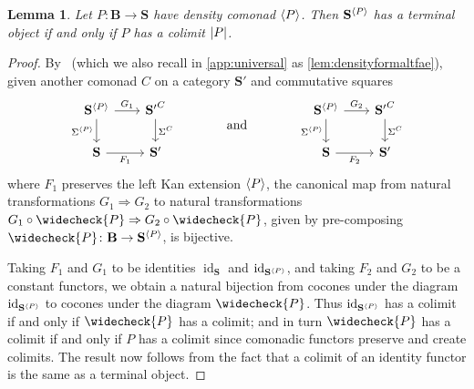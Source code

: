 \documentclass[11pt, oneside, article]{memoir}
\theoremstyle{plain}
\newtheorem{lemma}[theorem]{Lemma}
\theoremstyle{definition}
\theoremstyle{remark}
\DeclareMathOperator{\id}{id}
\DeclarePairedDelimiter{\gen}{\langle}{\rangle}
\DeclarePairedDelimiter{\abs}{\lvert}{\rvert}
\newcommand{\tn}[1]{\textnormal{#1}}
\newcommand{\cat}[1]{\mathbf{#1}}
\newcommand{\CoalgOn}[2]{{#2}^{#1}}
\newcommand{\CoalgS}[1]{\CoalgOn{#1}{\bS}}
\newcommand{\pts}[1]{{\abs{#1}}}
\newcommand{\lift}[1]{\widecheck{#1}}
\newcommand{\carr}{\Sigma}
\newcommand{\car}[1]{\carr^{#1}}
\newcommand{\carC}{\car{\cC}}
\newcommand{\carP}{\car{\cP}}
\newcommand{\ph}[1]{#1}
\newcommand{\cmnd}[1]{{#1}}
\newcommand{\cC}{\cmnd{C}}
\newcommand{\bB}{\cat{B}}
\newcommand{\bS}{\cat{S}}
\newcommand{\pP}{\ph{P}}
\newcommand{\cP}{\gen{\pP}}
\newcommand{\lP}{\lift{\pP}}
\newcommand{\PS}{\CoalgS{\cP}}
\newcommand{\hh}[2][]{#1 \tn{#2} #1}
\newcommand{\qqand}{\hh[\qquad]{and}}
\begin{document}
\begin{lemma}\label{lem:pts}
  Let $\pP \colon \bB \to \bS$ have density comonad $\cP$. Then $\PS$
  has a terminal object if and only if $\pP$ has a colimit
  $\pts{\pP}$.
\end{lemma}
\begin{proof}
  By~\cite[Proposition 7.6]{fairbanks:monads} (which we also recall in
  \cref{app:universal} as \cref{lem:densityformaltfae}), given another
  comonad $\cC$ on a category $\bS'$ and commutative squares
  \[
    \begin{tikzcd}[column sep=20]
      {\PS} & \CoalgOn{\cC}{\bS'} \\
      {\bS} & {\bS'}
      \arrow["G_1", from=1-1, to=1-2]
      \arrow["\carP"', from=1-1, to=2-1]
      \arrow["\carC", from=1-2, to=2-2]
      \arrow["F_1"', from=2-1, to=2-2]
    \end{tikzcd}
    \qquad\qqand\qquad
    \begin{tikzcd}[column sep=20]
      {\PS} & \CoalgOn{\cC}{\bS'} \\
      {\bS} & {\bS'}
      \arrow["G_2", from=1-1, to=1-2]
      \arrow["\carP"', from=1-1, to=2-1]
      \arrow["\carC", from=1-2, to=2-2]
      \arrow["F_2"', from=2-1, to=2-2]
    \end{tikzcd}
  \]
  where $F_1$ preserves the left Kan extension $\cP$, the canonical
  map from natural transformations $G_1 \Rightarrow G_2$ to natural
  transformations $G_1 \circ \lP \Rightarrow G_2 \circ \lP$, given by
  pre-composing $\lP \colon \bB \to \PS$, is bijective.

  Taking $F_1$ and $G_1$ to be identities $\id_{\bS}$ and $\id_{\PS}$,
  and taking $F_2$ and $G_2$ to be a constant functors, we obtain a
  natural bijection from cocones under the diagram $\id_{\PS}$ to
  cocones under the diagram $\lP$. Thus $\id_{\PS}$ has a colimit if
  and only if $\lP$ has a colimit; and in turn $\lP$ has a colimit if
  and only if $\pP$ has a colimit since comonadic functors preserve
  and create colimits. The result now follows from the fact that a
  colimit of an identity functor is the same as a terminal object.
\end{proof}
\end{document}
